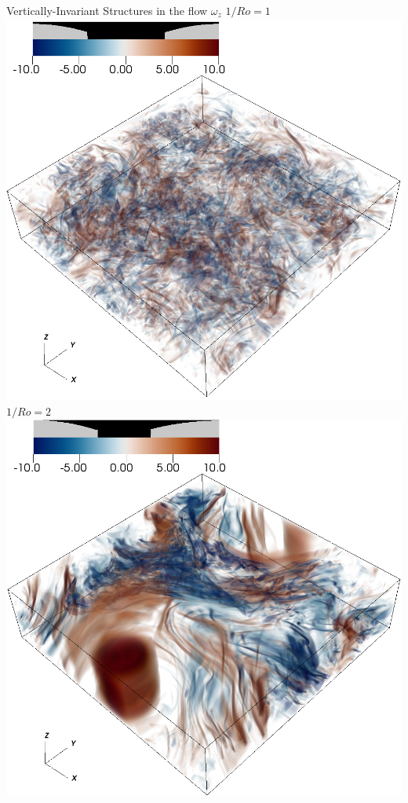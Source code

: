 \documentclass[aspecttatio=169]{beamer}
\begin{document}
\begin{frame}{Vertically-Invariant Structures in the flow}
    \centering
        $\omega_z$
    \emp
        \centering
        $1/Ro = 1$
        \includegraphics[width=.95\textwidth]{images/vortz_Om0.5_vr2.png}
    \emp
        \centering
        $1/Ro = 2$
        \includegraphics[width=.95\textwidth]{images/vortz_Om2_vr2.png}

\end{frame}
\end{document}
